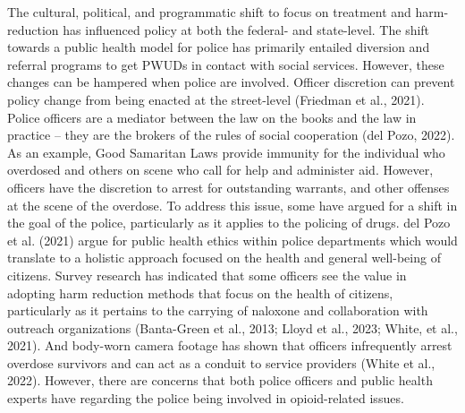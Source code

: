 The cultural, political, and programmatic shift to focus on treatment and harm-reduction has influenced policy at both the federal- and state-level. The shift towards a public health model for police has primarily entailed diversion and referral programs to get PWUDs in contact with social services. However, these changes can be hampered when police are involved. Officer discretion can prevent policy change from being enacted at the street-level (Friedman et al., 2021). Police officers are a mediator between the law on the books and the law in practice – they are the brokers of the rules of social cooperation (del Pozo, 2022). As an example, Good Samaritan Laws provide immunity for the individual who overdosed and others on scene who call for help and administer aid. However, officers have the discretion to arrest for outstanding warrants, and other offenses at the scene of the overdose. To address this issue, some have argued for a shift in the goal of the police, particularly as it applies to the policing of drugs. del Pozo et al. (2021) argue for public health ethics within police departments which would translate to a holistic approach focused on the health and general well-being of citizens. Survey research has indicated that some officers see the value in adopting harm reduction methods that focus on the health of citizens, particularly as it pertains to the carrying of naloxone and collaboration with outreach organizations (Banta-Green et al., 2013; Lloyd et al., 2023; White, et al., 2021). And body-worn camera footage has shown that officers infrequently arrest overdose survivors and can act as a conduit to service providers (White et al., 2022). However, there are concerns that both police officers and public health experts have regarding the police being involved in opioid-related issues.



